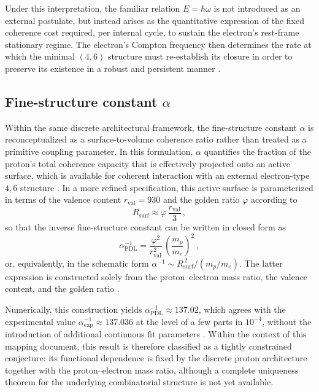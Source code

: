 \documentclass{article}
\begin{document}
Under this interpretation, the familiar relation \(E = \hbar \omega\) is not introduced as an external postulate, but instead arises as the quantitative expression of the fixed coherence cost required, per internal cycle, to sustain the electron’s rest-frame stationary regime. The electron’s Compton frequency then determines the rate at which the minimal \((4,6)\) structure must re-establish its closure in order to preserve its existence in a robust and persistent manner
\citep{PDL_Main_2026,PDL_position}.

\subsection{Fine-structure constant \texorpdfstring{\(\alpha\)}{alpha}}
\label{subsec:alpha}

Within the same discrete architectural framework, the fine-structure constant \(\alpha\) is reconceptualized as a surface-to-volume coherence ratio rather than treated as a primitive coupling parameter. In this formulation, \(\alpha\) quantifies the fraction of the proton’s total coherence capacity that is effectively projected onto an active surface, which is available for coherent interaction with an external electron-type \(4,6\) structure \citep{PDL_intro,PDL_Main_2026}. In a more refined specification, this active surface is parameterized in terms of the valence content
\(r_{\mathrm{val}} = 930\) and the golden ratio \(\varphi\) according to
\[
  R_{\mathrm{surf}} \approx \varphi \,\frac{r_{\mathrm{val}}}{3} \, ,
\]
so that the inverse fine-structure constant can be written in closed form as
\[
  \alpha^{-1}_{\mathrm{PDL}} = \frac{\varphi^{2}}{r_{\mathrm{val}}^{2}}\,\left(\frac{m_p}{m_e}\right)^{2} \, ,
\]
or, equivalently, in the schematic form \(\alpha^{-1} \sim R_{\mathrm{surf}}^{\,2}/(m_p/m_e)\). The latter expression is constructed solely from the proton–electron mass ratio, the valence content, and the golden ratio \citep{Alpha_PDL_v2_2026,Born_Golden_v2_2026}.

Numerically, this construction yields \(\alpha^{-1}_{\mathrm{PDL}} \approx 137.02\), which agrees with the experimental value \(\alpha^{-1}_{\mathrm{exp}} \approx 137.036\) at the level of a few parts in \(10^{-4}\), without the introduction of additional continuous fit parameters \citep{Alpha_PDL_v2_2026,PDL_intro}. Within the context of this mapping document, this result is therefore classified as a tightly constrained conjecture: its functional dependence is fixed by the discrete proton architecture together with the proton–electron mass ratio, although a complete uniqueness theorem for the underlying combinatorial structure is not yet available.
\end{document}
